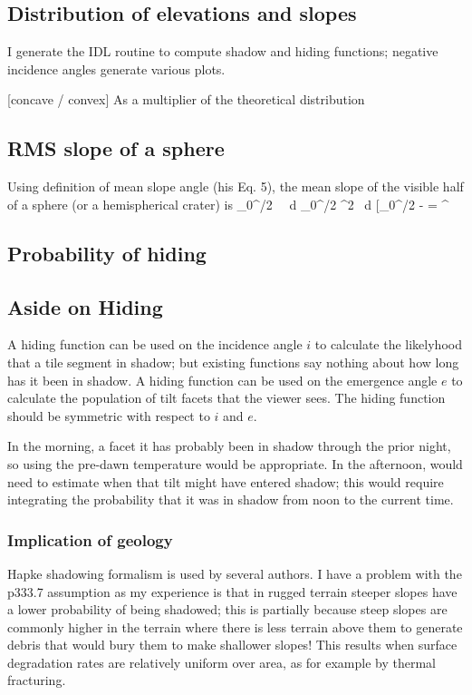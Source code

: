 \documentclass{article}
\begin{document}
\subsection{Distribution of elevations and slopes} %

I generate the IDL routine  to compute shadow and hiding functions;  negative incidence angles generate various plots.

 
 [concave / convex] As a multiplier of the theoretical distribution

\subsection{RMS slope of a sphere} %
Using  definition of mean slope angle (his Eq. 5), the mean slope of the visible half of a sphere (or a hemispherical crater) is  
\qbn \overline{\theta} \equiv \int_0^{\pi/2} \tan \theta  \cdot \sin \theta  \ \cos \theta  \ d \theta 
\Rightarrow  \int_0^{\pi/2} \sin^2 \theta \ d \theta 
\Rightarrow \bigg[_0^{\pi/2} - \cos \theta 
=   ^\circ \qen

\subsection{Probability of hiding} %

\subsection{Aside on Hiding}  %

A hiding function can be used on the incidence angle $i$ to calculate the
likelyhood that a tile segment in shadow; but existing functions say nothing
about how long has it been in shadow.  A hiding function can be used on the
emergence angle $e$ to calculate the population of tilt facets that the viewer
sees. The hiding function should be symmetric with respect to $i$ and $e$.

In the morning, a facet it has probably been in shadow through the prior night,
so using the pre-dawn temperature would be appropriate. In the afternoon, would
need to estimate when that tilt might have entered shadow; this would require
integrating the probability that it was in shadow from noon to the current
time.

\subsubsection{Implication of geology}
Hapke shadowing formalism is used by several authors. I have a problem with the
p333.7 assumption as my experience is that in rugged terrain steeper slopes have
a lower probability of being shadowed; this is partially because steep slopes
are commonly higher in the terrain where there is less terrain above them to
generate debris that would bury them to make shallower slopes! This results when
surface degradation rates are relatively uniform over area, as for example by thermal fracturing.
\end{document}
